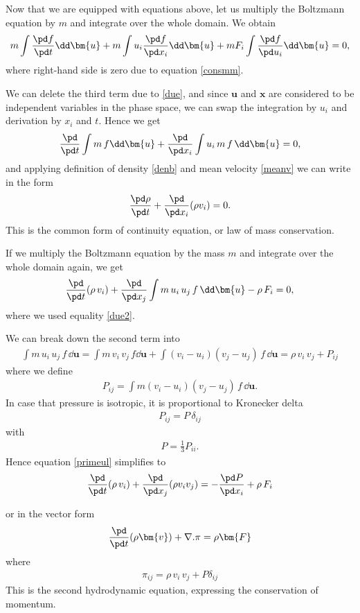 Now that we are equipped with equations above, let us multiply the Boltzmann equation by $m$ and integrate over the whole domain. We obtain
\begin{align}
m \int \frac{\pd f}{\pd t} \dd \bm{u} + m \int u_i \frac{\pd f}{\pd x_i} \dd \bm{u} + m F_i \int \frac{\pd f}{\pd u_i} \dd \bm{u} = 0,
\end{align}
where right-hand side is zero due to equation \ref{consmm}.

We can delete the third term due to \ref{due}, and since $\bm{u}$ and $\bm{x}$ are considered to be independent variables in the phase space, we can swap the integration by $u_i$ and derivation by $x_i$ and $t$. Hence we get
\begin{align}
\frac{\pd }{\pd t} \int m \, f \dd \bm{u} + \frac{\pd}{\pd x_i} \int u_i \, m \, f \, \dd \bm{u} = 0,
\end{align}
and applying definition of density \ref{denb} and mean velocity \ref{meanv}
we can write in the form
\begin{align}
\frac{\pd \rho}{\pd t} + \frac{\pd}{\pd x_i}(\rho v_i) = 0.
\end{align}
This is the common form of continuity equation, or law of mass conservation.

If we multiply the Boltzmann equation by the mass $m$ and integrate over the whole domain again, we get
\begin{align} \label{primeul}
\frac{\pd}{\pd t} (\rho \, v_i) + \frac{\pd }{\pd x_j} \int m \, u_i \, u_j \, f \, \dd \bm{u} - \rho \, F_i = 0,
\end{align}
where we used equality \ref{due2}.

We can break down the second term into
\begin{align} 
\int m \, u_i \, u_j \, f \, \dd \bm{u} = \int m \, v_i \, v_j \, f \dd \bm{u} + \int (v_i - u_i) (v_j - u_j) \, f \, \dd \bm{u} = \rho \, v_i \, v_j + P_{ij}
\end{align}
where we define 
\begin{align}
P_{ij} = \int m (v_i - u_i) (v_j - u_j) \, f \, \dd \bm{u}.
\end{align}
In case that pressure is isotropic, it is proportional to Kronecker delta
\begin{align}
P_{ij} = P \, \delta_{ij}
\end{align}
with 
\begin{align}
P = \frac{1}{3}P_{ii}.
\end{align}
Hence equation \ref{primeul} simplifies to
\begin{align}
\frac{\pd}{\pd t} (\rho \, v_i) + \frac{\pd }{\pd x_j} (\rho v_i v_j) =  - \frac{\pd P}{\pd x_i}+ \rho \, F_i
\end{align}

or in the vector form
\begin{align}
\frac{\pd }{\pd t} (\rho \bm{v}) + \nabla . \pi = \rho \bm{F}
\end{align}
where
\begin{align}
\pi_{ij} = \rho \, v_i \, v_j + P \delta_{ij}
\end{align}
This is the second hydrodynamic equation, expressing the conservation of momentum.
